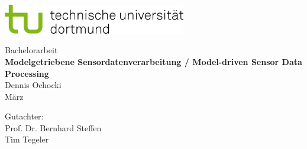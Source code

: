 \begin{titlepage}
\vspace*{-2cm}
\newlength{\links}
\setlength{\links}{-1.5cm}
\sffamily
\hspace*{\links}
\begin{minipage}{12.5cm}
\includegraphics[width=8cm]{bilder/tud_logo_rgb}
\end{minipage}

\vspace*{4cm}

\hspace*{\links}
\hspace*{-0.2cm}
\begin{minipage}{9cm}
\large
\begin{center}
{\Large Bachelorarbeit} \\
\vspace*{1cm}
\textbf{Modelgetriebene Sensordatenverarbeitung / Model-driven Sensor Data Processing} \\
\vspace*{1cm}
Dennis Ochocki\\
März
\end{center}
\end{minipage}
\normalsize
\vspace*{5.5cm}


\vspace*{2.1cm}

\hspace*{\links}
\begin{minipage}[b]{5cm}
\raggedright
Gutachter: \\
Prof. Dr. Bernhard Steffen \\
Tim Tegeler \\
\end{minipage}


\end{titlepage}
